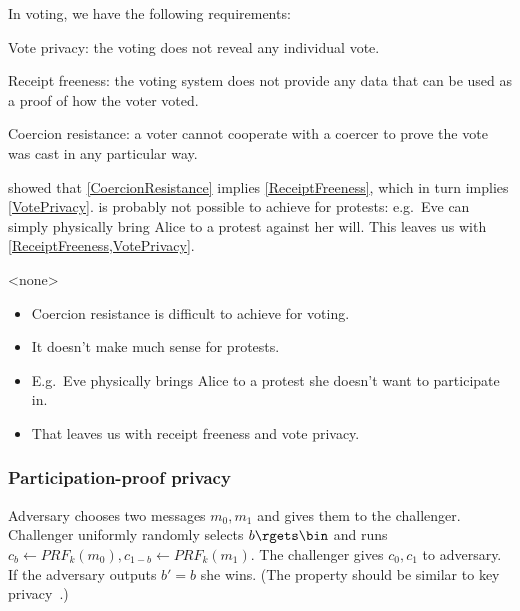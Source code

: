 In voting, we have the following requirements:
\begin{frame}
\begin{requirements}[P]
\item\label{VotePrivacy} Vote privacy: the voting does not reveal any 
  individual vote.
\item\label{ReceiptFreeness} Receipt freeness: the voting system does not 
  provide any data that can be used as a proof of how the voter voted.
\item\label{CoercionResistance} Coercion resistance: a voter cannot cooperate 
  with a coercer to prove the vote was cast in any particular way.
\end{requirements}
\pause{}
\end{frame}
\Textcite{VerifyingPrivacyPropertiesOfVotingProtocols} showed that 
\cref{CoercionResistance} implies \cref{ReceiptFreeness}, which in turn implies
\cref{VotePrivacy}.
 is probably not possible to achieve for protests:
e.g.\ Eve can simply physically bring Alice to a protest against her will.
This leaves us with \cref{ReceiptFreeness,VotePrivacy}.

\mode<none>{%
\begin{frame}
  \begin{remark}
    \begin{itemize}
      \item Coercion resistance is difficult to achieve for voting.
      \item It doesn't make much sense for protests.
      \item E.g.\ Eve physically brings Alice to a protest she doesn't want to 
        participate in.
      \item That leaves us with receipt freeness and vote privacy.
    \end{itemize}
  \end{remark}
\end{frame}
}

\subsubsection{Participation-proof privacy}

\begin{frame}
\begin{definition}
  Adversary chooses two messages \(m_0, m_1\) and gives them to the challenger.
  Challenger uniformly randomly selects \(b\rgets \bin\) and runs \(c_b \gets 
    PRF_k(m_0), c_{1-b} \gets PRF_k(m_1)\).
  The challenger gives \(c_0, c_1\) to adversary.
  If the adversary outputs \(b' = b\) she wins.
  (The property should be similar to key privacy~\cite{KeyPrivacy}.)
\end{definition}
\end{frame}

